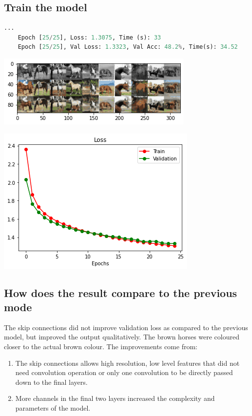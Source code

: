 \documentclass{article}
\begin{document}
\subsection*{Train the model}


\begin{lstlisting}[language=Python]
	...
	Epoch [25/25], Loss: 1.3075, Time (s): 33
	Epoch [25/25], Val Loss: 1.3323, Val Acc: 48.2%, Time(s): 34.52
\end{lstlisting}

\includegraphics{C2.1.png}

\includegraphics{C2.2.png}

\subsection*{ How  does  the  result  compare  to  the  previous  mode}

The skip connections did not improve validation loss as compared to the previous model, but improved the output qualitatively. The brown horses were coloured closer to the actual brown colour. The improvements come from:

\begin{enumerate}
\item The skip connections allows high resolution, low level features that did not need convolution operation or only one convolution to be directly passed down to the final layers. 
\item More channels in the final two layers increased the complexity and parameters of the model.
\end{enumerate}
\end{document}
